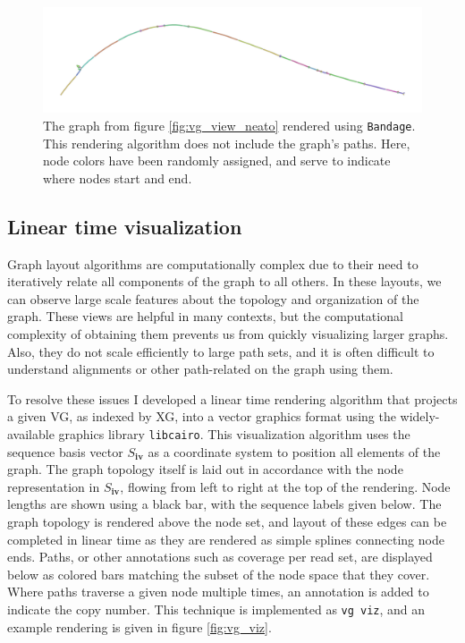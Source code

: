 \begin{figure}[htbp!] 
\centering    
\includegraphics[width=1.0\textwidth]{Chapter2/Figs/vg_view_H-3136_Bandage.pdf}
\caption[Force-directed layout with Bandage]{
  The graph from figure \ref{fig:vg_view_neato} rendered using {\tt Bandage}.
  This rendering algorithm does not include the graph's paths.
  Here, node colors have been randomly assigned, and serve to indicate where nodes start and end.
}
\label{fig:vg_view_bandage}
\end{figure}

\subsection{Linear time visualization}

Graph layout algorithms are computationally complex due to their need to iteratively relate all components of the graph to all others.
In these layouts, we can observe large scale features about the topology and organization of the graph.
These views are helpful in many contexts, but the computational complexity of obtaining them prevents us from quickly visualizing larger graphs.
Also, they do not scale efficiently to large path sets, and it is often difficult to understand alignments or other path-related on the graph using them.

To resolve these issues I developed a linear time rendering algorithm that projects a given VG, as indexed by XG, into a vector graphics format using the widely-available graphics library {\tt libcairo}.
This visualization algorithm uses the sequence basis vector $S_\textbf{iv}$ as a coordinate system to position all elements of the graph.
The graph topology itself is laid out in accordance with the node representation in $S_\textbf{iv}$, flowing from left to right at the top of the rendering.
Node lengths are shown using a black bar, with the sequence labels given below.
The graph topology is rendered above the node set, and layout of these edges can be completed in linear time as they are rendered as simple splines connecting node ends.
Paths, or other annotations such as coverage per read set, are displayed below as colored bars matching the subset of the node space that they cover.
Where paths traverse a given node multiple times, an annotation is added to indicate the copy number.
This technique is implemented as {\tt vg viz}, and an example rendering is given in figure \ref{fig:vg_viz}.

